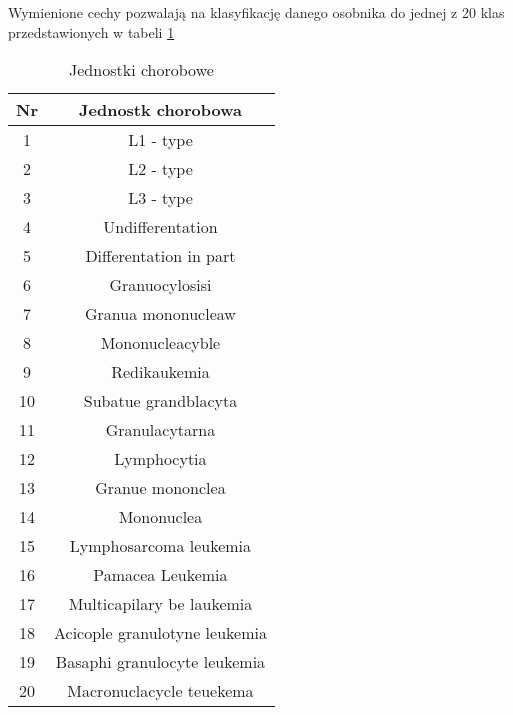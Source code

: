 Wymienione cechy pozwalają na klasyfikację danego osobnika do jednej z 20 klas przedstawionych w tabeli \ref{2}

\begin{table}[h!]
	\centering
	\begin{tabular}{||c | c ||} 
		\hline
		Nr & Jednostk chorobowa \\ [0.5ex] 
		\hline\hline
		1 & L1 - type \\ 
		2 & L2 - type \\
		3 & L3 - type \\
		4 & Undifferentation \\
		5 & Differentation in part \\
		6 & Granuocylosisi \\
		7 & Granua mononucleaw \\
		8 & Mononucleacyble \\
		9 & Redikaukemia \\
		10 & Subatue grandblacyta \\
		11 & Granulacytarna \\
		12 & Lymphocytia \\
		13 & Granue mononclea \\
		14 & Mononuclea \\
		15 & Lymphosarcoma leukemia \\
		16 & Pamacea Leukemia \\
		17 & Multicapilary be laukemia \\
		18 & Acicople granulotyne leukemia \\
		19 & Basaphi granulocyte leukemia \\
		20 & Macronuclacycle teuekema \\ [1ex] 
		\hline
	\end{tabular}
	\caption{Jednostki chorobowe}
	\label{2}
\end{table}